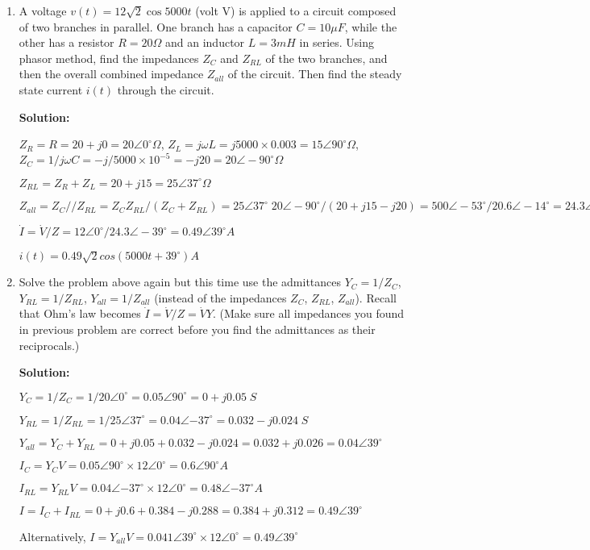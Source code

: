 \begin{enumerate}
\item A voltage $v(t)=12\sqrt{2} \cos 5000 t$ (volt V) is applied to a circuit
composed of two branches in parallel. One branch has a capacitor $C=10\mu F$,
while the other has a resistor $R=20\Omega$ and an inductor $L=3 mH$ in series.
Using phasor method, find the impedances $Z_C$ and $Z_{RL}$ of the two branches,
and then the overall combined impedance $Z_{all}$ of the circuit. Then find
the steady state current $i(t)$ through the circuit.

{\bf Solution:}

$Z_R=R=20+j0=20\angle 0^\circ \Omega$, $Z_L=j\omega L=j5000\times 0.003
=15\angle 90^\circ \Omega$, $Z_C=1/j\omega C=-j/5000 \times 10^{-5}=-j20
=20\angle -90^\circ \Omega$

$Z_{RL}=Z_R+Z_L=20+j15=25\angle 37^\circ \Omega$

$Z_{all}=Z_C//Z_{RL}=Z_C Z_{RL}/(Z_C+Z_{RL})=25\angle 37^\circ \; 
20\angle -90^\circ/(20+j15-j20)=500\angle -53^\circ/20.6\angle -14^\circ
=24.3\angle -39^\circ=18.9-j15.3 \Omega $

$\dot{I}=\dot{V}/{Z}=12\angle 0^\circ/24.3\angle -39^\circ=0.49\angle 39^\circ A$

  $i(t)=0.49\sqrt{2} cos(5000t+39^\circ) A$

\item Solve the problem above again but this time use the admittances 
$Y_C=1/Z_C$, $Y_{RL}=1/Z_{RL}$, $Y_{all}=1/Z_{all}$ (instead of the
impedances $Z_C$, $Z_{RL}$, $Z_{all}$). Recall that Ohm's law becomes
$\dot{I}=\dot{V}/Z=\dot{V}Y$. (Make sure all impedances you found in 
previous problem are correct before you find the admittances as their 
reciprocals.)

{\bf Solution:}

$Y_C=1/Z_C=1/20\angle{0^\circ}=0.05\angle{90^\circ}=0+j0.05\;S$

$Y_{RL}=1/Z_{RL}=1/25\angle{37^\circ}=0.04\angle{-37^\circ}=0.032-j0.024\;S$

$Y_{all}=Y_C+Y_{RL}=0+j0.05 + 0.032-j0.024=0.032+j0.026=0.04\angle{39^\circ}$

$I_C=Y_C V=0.05\angle{90^\circ} \times 12\angle{0^\circ}=0.6\angle{90^\circ}A$

$I_{RL}=Y_{RL} V=0.04\angle{-37^\circ} \times 12\angle{0^\circ}=0.48\angle{-37^\circ}A$

$I=I_C+I_{RL}=0+j0.6+0.384-j0.288=0.384+j0.312=0.49\angle{39^\circ}$

Alternatively,
$I=Y_{all}V=0.041\angle{39^\circ} \times 12\angle{0^\circ}=0.49\angle{39^\circ}$



\end{enumerate}
